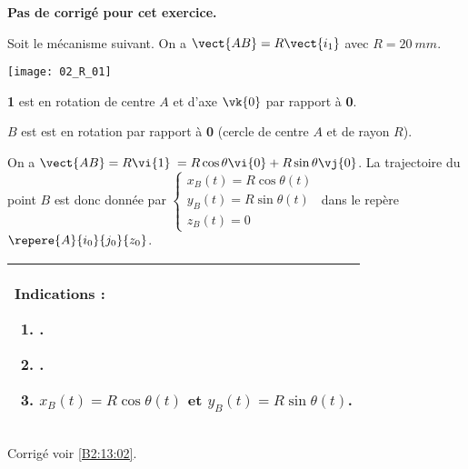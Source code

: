 \normaltrue
\correctiontrue


\setcounter{numques}{0}
\ifcorrection
\else
\textbf{Pas de corrigé pour cet exercice.}
\fi

\ifprof
\else
Soit le mécanisme suivant. On a $\vect{AB}=R\vect{i_1}$ avec $R=\SI{20}{mm}$. 
\begin{center}
\texttt{[image: 02\_R\_01]}
\end{center}
\fi

\ifprof
\textbf{1} est en rotation de centre $A$ et d'axe $\vk{0}$ par rapport à \textbf{0}.
\else
\fi

\ifprof
$B$ est est en rotation par rapport à \textbf{0} (cercle de centre $A$ et de rayon $R$).
\else
\fi

\ifprof

On a $\vect{AB}=R\vi{1}$ $=R\cos\theta \vi{0}+R\sin\theta \vj{0}$. La trajectoire du point $B$ est donc donnée par 
$\left\{ 
\begin{array}{l}
x_B(t) = R\cos\theta (t) \\
y_B(t) = R\sin\theta (t) \\
z_B(t)=0 
\end{array}
\right.$ dans le repère $\repere{A}{i_0}{j_0}{z_0}$.

\else
\fi

\ifprof
\else
\footnotesize
\begin{center}
\begin{tabular}{|p{.9\linewidth}|}
\hline
Indications :
\begin{enumerate}
\item .
\item .
\item $x_B(t) = R\cos\theta (t)$ et $y_B(t) = R\sin\theta (t)$.
\end{enumerate} \\ \hline
\end{tabular}
\end{center}
\normalsize

\begin{flushright}
\footnotesize{Corrigé  voir \ref{B2:13:02}.}
\end{flushright}%
\fi
